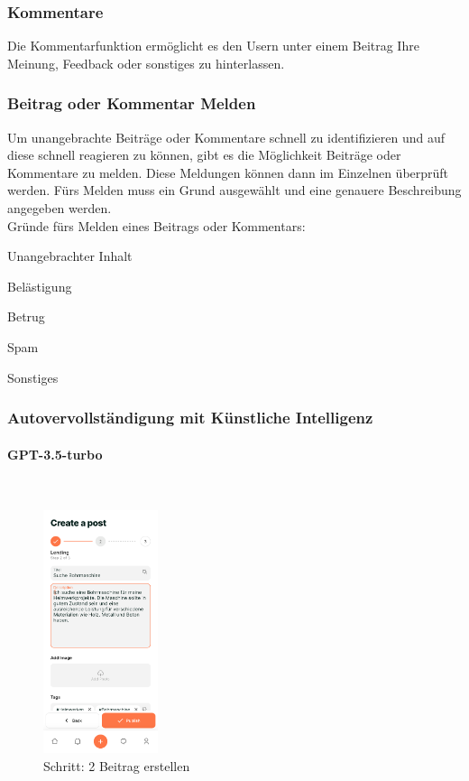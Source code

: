 \subsubsection{Kommentare}
Die Kommentarfunktion ermöglicht es den Usern unter einem Beitrag Ihre Meinung, Feedback oder sonstiges zu hinterlassen.

\subsubsection{Beitrag oder Kommentar Melden}
Um unangebrachte Beiträge oder Kommentare schnell zu identifizieren und auf diese schnell reagieren zu können, gibt es die Möglichkeit Beiträge oder Kommentare zu melden. Diese Meldungen können dann im Einzelnen überprüft werden. Fürs Melden muss ein Grund ausgewählt und eine genauere Beschreibung angegeben werden.
\\
Gründe fürs Melden eines Beitrags oder Kommentars:

\begin{compactitem}
  \item Unangebrachter Inhalt
  \item Belästigung
  \item Betrug
  \item Spam
  \item Sonstiges
\end{compactitem}

\subsubsection{Autovervollständigung
  mit Künstliche Intelligenz}
\paragraph{GPT-3.5-turbo}\mbox{} \\


\begin{figure}[H]
  \centering
  \includegraphics[width=0.3\textwidth]{pics/create-post.png}
  \caption{Schritt: 2 Beitrag erstellen}
  \label{fig:createpost}
\end{figure}


